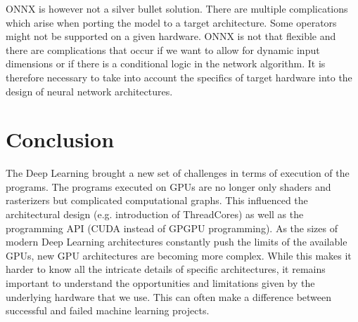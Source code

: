 \documentclass{article}
\begin{document}
ONNX is however not a silver bullet solution.
There are multiple complications which arise when porting the model to a target architecture.
Some operators might not be supported on a given hardware.
ONNX is not that flexible and there are complications that occur if we want to allow for dynamic input dimensions or if there is a conditional logic in the network algorithm.
It is therefore necessary to take into account the specifics of target hardware into the design of neural network architectures.

\section{Conclusion}
The Deep Learning brought a new set of challenges in terms of execution of the programs. The programs executed on
GPUs are no longer only shaders and rasterizers but complicated computational graphs. This influenced the architectural design (e.g. introduction of ThreadCores) as well as the programming API (CUDA instead
of GPGPU programming).
As the sizes of modern Deep Learning architectures constantly push the limits of the available GPUs, new GPU architectures are becoming more complex.
While this makes it harder to know all the intricate details of specific architectures, it remains important to understand the opportunities and limitations given by the underlying hardware that we use.
This can often make a difference between successful and failed machine learning projects.


\end{document}
